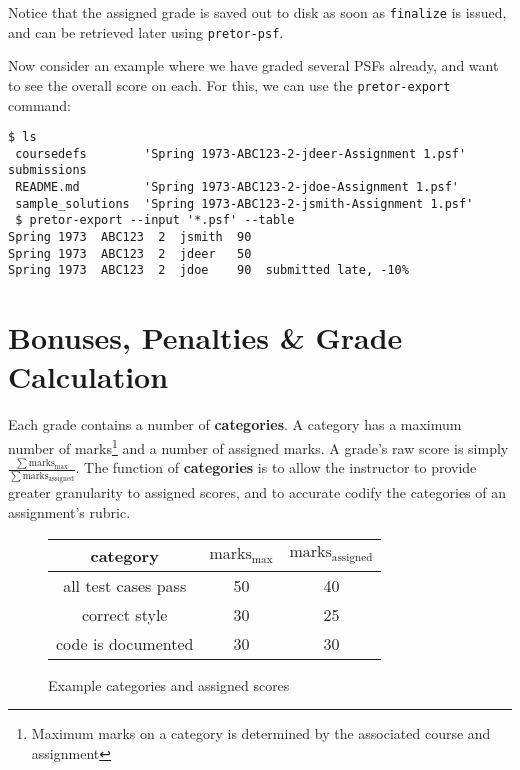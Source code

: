 \documentclass{book}
\begin{document}
Notice that the assigned grade is saved out to disk as soon as
\texttt{finalize} is issued, and can be retrieved later using
\texttt{pretor-psf}.

Now consider an example where we have graded several PSFs already, and want to
see the overall score on each. For this, we can use the \texttt{pretor-export}
command:

\begin{verbatim}
$ ls
 coursedefs        'Spring 1973-ABC123-2-jdeer-Assignment 1.psf'    submissions
 README.md         'Spring 1973-ABC123-2-jdoe-Assignment 1.psf'
 sample_solutions  'Spring 1973-ABC123-2-jsmith-Assignment 1.psf'
 $ pretor-export --input '*.psf' --table
Spring 1973  ABC123  2  jsmith  90
Spring 1973  ABC123  2  jdeer   50
Spring 1973  ABC123  2  jdoe    90  submitted late, -10%
\end{verbatim}

\section{Bonuses, Penalties \& Grade Calculation} \label{sec:grade_calculation}

Each grade contains a number of \textbf{categories}. A category has a maximum
number of marks\footnote{Maximum marks on a category is determined by the
associated course and assignment} and a number of assigned marks. A grade's raw
score is simply
$\frac{\sum\text{marks}_\text{max}}{\sum\text{marks}_\text{assigned}}$. The
function of \textbf{categories} is to allow the instructor to provide greater
granularity to assigned scores, and to accurate codify the categories of
an assignment's rubric.

\begin{wrapfigure}{l}{0.5\textwidth}

	\centering

	\begin{tabular}{c | c | c}

		category & $\text{marks}_\text{max}$ & $\text{marks}_\text{assigned}$ \\
		\hline\hline
		all test cases pass & 50 & 40 \\
		\hline
		correct style & 30 & 25 \\
		\hline
		code is documented & 30 & 30 \\

	\end{tabular}

	\caption{\label{fig:category_example} Example categories and assigned
	scores}

\end{wrapfigure}
\end{document}
